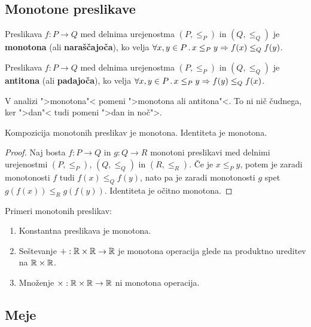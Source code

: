 \subsection{Monotone preslikave}

\begin{definicija}
  Preslikava $f : P \to Q$ med delnima urejenostma $(P, {\leq_P})$ in $(Q, {\leq_Q})$ je
  \textbf{monotona} (ali \textbf{naraščajoča}), ko velja $\forall x, y \in P \,.\, x \leq_P y \Rightarrow f(x) \leq_Q f(y)$.
\end{definicija}

\begin{definicija}
  Preslikava $f : P \to Q$ med delnima urejenostma $(P, \leq_P)$ in $(Q, \leq_Q)$ je
  \textbf{antitona} (ali \textbf{padajoča}), ko velja $\forall x, y \in P \,.\, x \leq_P y \Rightarrow f(y) \leq_Q f(x)$.
\end{definicija}

\begin{opomba}
  V analizi ">monotona"< pomeni ">monotona ali antitona"<. To ni nič
  čudnega, ker ">dan"< tudi pomeni ">dan in noč">.
\end{opomba}

\begin{izrek}
  Kompozicija monotonih preslikav je monotona. Identiteta je monotona.
\end{izrek}

\begin{proof}
  Naj bosta $f : P \to Q$ in $g : Q \to R$ monotoni preslikavi med delnimi
  urejenostmi $(P, {\leq_P})$, $(Q, {\leq_Q})$ in $(R, {\leq_R})$. Če je $x \leq_P y$, potem je zaradi monotonosti $f$ tudi $f(x) \leq_Q f(y)$, nato pa je zaradi monotonosti $g$ spet $g(f(x)) \leq_R g(f(y))$. Identiteta je očitno monotona.
\end{proof}

\begin{zgled}
  Primeri monotonih preslikav:
  \begin{enumerate}
    \item Konstantna preslikava je monotona.
    \item Seštevanje ${+} : \mathbb{R} \times \mathbb{R} \to \mathbb{R}$ je monotona operacija glede na produktno ureditev na $\mathbb{R} \times \mathbb{R}$.
    \item Množenje ${\times} : \mathbb{R} \times \mathbb{R} \to \mathbb{R}$ ni monotona operacija.
  \end{enumerate}
\end{zgled}


\subsection{Meje}

